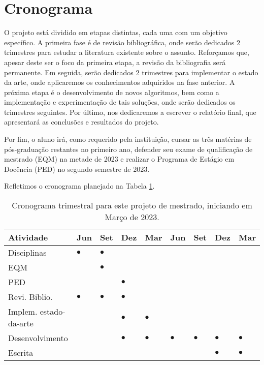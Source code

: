 \documentclass[10pt]{article}
\begin{document}
\section{Cronograma}
\label{sec:org387a147}
O projeto está dividido em etapas distintas, cada uma com um objetivo específico.
A primeira fase é de revisão bibliográfica, onde serão dedicados \(2\) trimestres para estudar a literatura existente sobre o assunto.
Reforçamos que, apesar deste ser o foco da primeira etapa, a revisão da bibliografia será permanente.
Em seguida, serão dedicados \(2\) trimestres para implementar o estado da arte, onde aplicaremos os conhecimentos adquiridos na fase anterior.
A próxima etapa é o desenvolvimento de novos algoritmos, bem como a implementação e experimentação de tais soluções, onde serão dedicados os trimestres seguintes.
Por último, nos dedicaremos a escrever o relatório final, que apresentará as conclusões e resultados do projeto.

Por fim, o aluno irá, como requerido pela instituição, cursar as três matérias de pós-graduação restantes no primeiro ano, defender seu exame de qualificação de mestrado (EQM) na metade de 2023 e realizar o Programa de Estágio em Docência (PED) no segundo semestre de 2023.

Refletimos o cronograma planejado na Tabela \ref{tab:cron}.

\begin{table}[htbp]
\caption{\label{tab:cron}Cronograma trimestral para este projeto de mestrado, iniciando em Março de 2023.}
\centering
\begin{tabular}{lllllllll}
Atividade & Jun & Set & Dez & Mar & Jun & Set & Dez & Mar\\[0pt]
\hline
Disciplinas & \(\bullet\) & \(\bullet\) &  &  &  &  &  & \\[0pt]
EQM &  & \(\bullet\) &  &  &  &  &  & \\[0pt]
PED &  &  & \(\bullet\) &  &  &  &  & \\[0pt]
Revi. Biblio. & \(\bullet\) & \(\bullet\) & \(\bullet\) &  &  &  &  & \\[0pt]
Implem. estado-da-arte &  &  & \(\bullet\) & \(\bullet\) &  &  &  & \\[0pt]
Desenvolvimento &  &  & \(\bullet\) & \(\bullet\) & \(\bullet\) & \(\bullet\) & \(\bullet\) & \(\bullet\)\\[0pt]
Escrita &  &  &  &  &  &  & \(\bullet\) & \(\bullet\)\\[0pt]
\end{tabular}
\end{table}

\printbibliography
\end{document}
